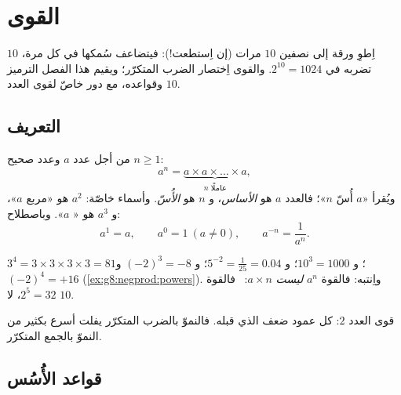 \chapter{القوى}\label{ch:g8:powers}

اِطوِ ورقة إلى نصفين $10$ مرات (إن اِستطعت!): فيتضاعف سُمكها
في كل مرة،  $10$ تضربه في
$2^{10} = 1024$. والقوى اِختصار الضرب المتكرّر؛
ويقيم هذا الفصل الترميز وقواعده، مع دور خاصّ
لقوى العدد $10$.

\section{التعريف}

\begin{definition}[القوة]\label{def:g8:powers:def}
من أجل عدد $a$ وعدد صحيح $n \geq 1$:
\[
a^n = \underbrace{a \times a \times \dots \times a}_{n
\text{ عاملًا}},
\]
ويُقرأ «$a$ أُسّ $n$»؛ فالعدد $a$ هو \emph{الأساس}، و $n$ هو
\emph{الأُسّ}. وأسماء خاصّة: $a^2$ هو «مربع $a$»،
و $a^3$ هو « $a$». وباصطلاح:
\[
a^1 = a,
\qquad
a^0 = 1 \ (a \neq 0),
\qquad
a^{-n} = \frac{1}{a^n}.
\]
\end{definition}

\begin{example}\label{ex:g8:powers:def}
$3^4 = 3 \times 3 \times 3 \times 3 = 81$؛ \quad
و $10^3 = 1000$؛ \quad و $5^{-2} = \frac{1}{25} = 0.04$؛ \quad
و $(-2)^3 = -8$ و $(-2)^4 = +16$
(\cref{ex:g8:negprod:powers}). واِنتبه: فالقوة $a^n$ \emph{ليست}
$a \times n$: \ فالقوة $2^5 = 32$، لا $10$.
\end{example}

\begin{omfigure}

{\small قوى العدد $2$: كل عمود ضعف الذي قبله. فالنموّ
بالضرب المتكرّر يفلت أسرع بكثير من النموّ بالجمع
المتكرّر.}
\end{omfigure}

\section{قواعد الأُسُس}

